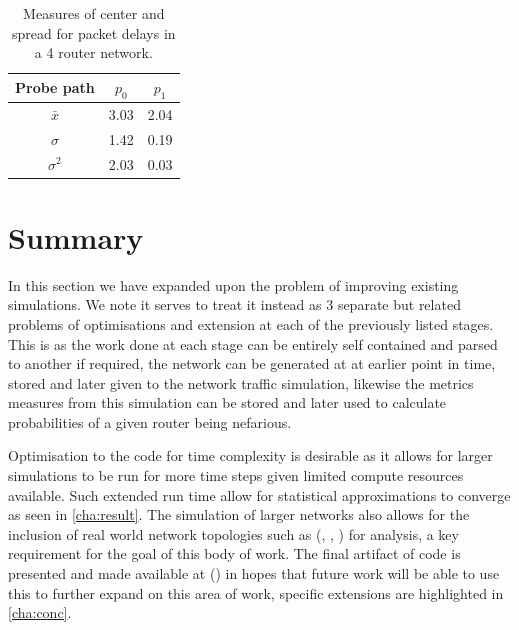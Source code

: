 \begin{table}[H]
    \centering
    \begin{tabular}{||c c c||}
        \hline
        Probe path & $p_0$ & $p_1$ \\ [0.5ex]
        \hline\hline
        $\bar{x}$   & 3.03 & 2.04 \\
        $\sigma$    & 1.42 & 0.19 \\
        $\sigma^2$  & 2.03 & 0.03 \\ [1ex]
        \hline
    \end{tabular}
    \caption{Measures of center and spread for packet delays in a 4 router network.}
    \label{tbl:4routerstats}
\end{table}

\section{Summary}
\label{sec:Iintroductionsummary}

In this section we have expanded upon the problem of improving existing simulations. We note it serves to treat it instead as 3 separate but related problems of optimisations and extension at each of the previously listed stages. This is as the work done at each stage can be entirely self contained and parsed to another if required, the network can be generated at at earlier point in time, stored and later given to the network traffic simulation, likewise the metrics measures from this simulation can be stored and later used to calculate probabilities of a given router being nefarious.\par
Optimisation to the code for time complexity is desirable as it allows for larger simulations to be run for more time steps given limited compute resources available. Such extended run time allow for statistical approximations to converge as seen in \cref{cha:result}. The simulation of larger networks also allows for the inclusion of real world network topologies such as (\cite{cadi_caida_2002}, \cite{university_of_washington_rocketfuel_2002}, \cite{medina_brite_2001}) for analysis, a key requirement for the goal of this body of work. The final artifact of code is presented and made available at (\cite{sylvester_millar_real_2021}) in hopes that future work will be able to use this to further expand on this area of work, specific extensions are highlighted in \cref{cha:conc}.